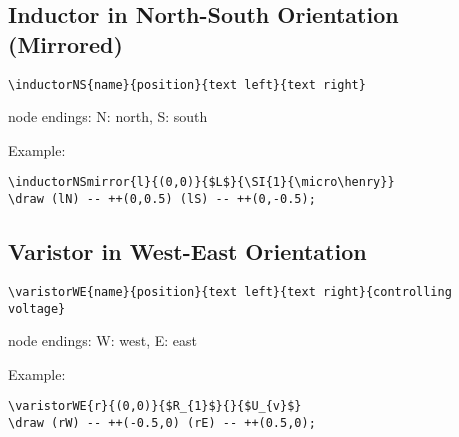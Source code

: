 \documentclass[parskip=full]{scrartcl}
\begin{document}
\subsection{Inductor in North-South Orientation (Mirrored)}

\begin{verbatim}
\inductorNS{name}{position}{text left}{text right}
\end{verbatim}
node endings: N: north, S: south

Example:\\
\begin{minipage}{0.8\textwidth}
\begin{verbatim}
\inductorNSmirror{l}{(0,0)}{$L$}{\SI{1}{\micro\henry}}
\draw (lN) -- ++(0,0.5) (lS) -- ++(0,-0.5);
\end{verbatim}
\end{minipage}
\begin{minipage}{0.19\textwidth}
\end{minipage}

\subsection{Varistor in West-East Orientation}

\begin{verbatim}
\varistorWE{name}{position}{text left}{text right}{controlling voltage}
\end{verbatim}
node endings: W: west, E: east

Example:\\
\begin{minipage}{0.8\textwidth}
\begin{verbatim}
\varistorWE{r}{(0,0)}{$R_{1}$}{}{$U_{v}$}
\draw (rW) -- ++(-0.5,0) (rE) -- ++(0.5,0);
\end{verbatim}
\end{minipage}
\begin{minipage}{0.19\textwidth}
\end{minipage}
\end{document}
